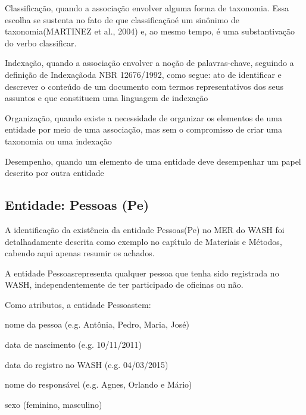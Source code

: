 \documentclass[
12pt,		%
openright,	%
twoside,  %
a4paper,			%
chapter=TITLE,		%
english,			%
french,				%
spanish,			%
brazil				%
]{USPSC-classe/USPSC}
\begin{document}
\begin{alineas}
\item Classifica\c{c}\~ao, quando a associa\c{c}\~ao envolver alguma forma de taxonomia. Essa escolha se sustenta no fato de que \textquotedbl classifica\c{c}\~ao\textquotedbl  \'e um sin\^onimo de \textquotedbl taxonomia\textquotedbl   (MARTINEZ et al., 2004) e, ao mesmo tempo, \'e uma substantiva\c{c}\~ao do verbo classificar.
\item Indexa\c{c}\~ao, quando a associa\c{c}\~ao envolver a no\c{c}\~ao de palavras-chave, seguindo a defini\c{c}\~ao de \textquotedbl Indexa\c{c}\~ao\textquotedbl  da NBR 12676/1992, como segue: \textquotedbl ato de identificar e descrever o conte\'udo de um documento com termos representativos dos seus assuntos e que constituem uma linguagem de indexa\c{c}\~ao\textquotedbl 
\item Organiza\c{c}\~ao, quando existe a necessidade de organizar os elementos de uma entidade por meio de uma associa\c{c}\~ao, mas sem o compromisso de criar uma taxonomia ou uma indexa\c{c}\~ao
\item Desempenho, quando um elemento de uma entidade deve desempenhar um papel descrito por outra entidade
\end{alineas}

\subsection[Entidade: Pessoas (Pe)]{Entidade: Pessoas (Pe)}\label{Entidade: Pessoas (Pe)}
A identifica\c{c}\~ao da exist\^encia da entidade \textquotedbl Pessoas\textquotedbl  (Pe) no MER do WASH foi detalhadamente descrita como exemplo no cap\'{\i}tulo de Materiais e M\'etodos, cabendo aqui apenas resumir os achados.




A entidade \textquotedbl Pessoas\textquotedbl  representa qualquer pessoa que tenha sido registrada no WASH, independentemente de ter participado de oficinas ou n\~ao.




Como atributos, a entidade \textquotedbl Pessoas\textquotedbl  tem:





\begin{alineas}
\item nome da pessoa (e.g. Ant\^onia, Pedro, Maria, Jos\'e)
\item data de nascimento (e.g. 10/11/2011)
\item data do registro no WASH (e.g. 04/03/2015)
\item nome do respons\'avel (e.g. Agnes, Orlando e M\'ario)
\item sexo (feminino, masculino)
\end{alineas}
\end{document}
